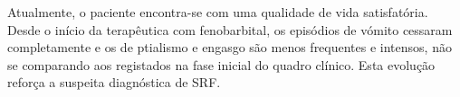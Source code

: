 Atualmente, o paciente encontra-se com uma qualidade de vida satisfatória. Desde o início da terapêutica com fenobarbital, os episódios de vómito cessaram completamente e os de ptialismo e engasgo são menos frequentes e intensos, não se comparando aos registados na fase inicial do quadro clínico. Esta evolução reforça a suspeita diagnóstica de SRF.











 






























